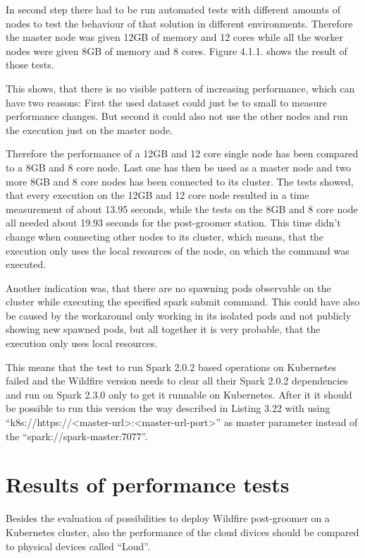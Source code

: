 In second step there had to be run automated tests with different amounts of nodes to test the behaviour of that solution in different environments. Therefore the master node was given 12GB of memory and 12 cores while all the worker nodes were given 8GB of memory and 8 cores. Figure 4.1.1. shows the result of those tests.

This shows, that there is no visible pattern of increasing performance, which can have two reasons: First the used dataset could just be to small to measure performance changes. But second it could also not use the other nodes and run the execution just on the master node.

Therefore the performance of a 12GB and 12 core single node has been compared to a 8GB and 8 core node. Last one has then be used as a master node and two more 8GB and 8 core nodes has been connected to its cluster. The tests showed, that every execution on the 12GB and 12 core node resulted in a time measurement of about 13.95 seconds, while the tests on the 8GB and 8 core node all needed about 19.93 seconds for the post-groomer station. This time didn't change when connecting other nodes to its cluster, which means, that the execution only uses the local resources of the node, on which the command was executed.

Another indication was, that there are no spawning pods observable on the cluster while executing the specified spark submit command. This could have also be caused by the workaround only working in its isolated pods and not publicly showing new spawned pods, but all together it is very probable, that the execution only uses local resources.

This means that the test to run Spark 2.0.2 based operations on Kubernetes failed and the Wildfire version needs to clear all their Spark 2.0.2 dependencies and run on Spark 2.3.0 only to get it runnable on Kubernetes. After it it should be possible to run this version the way described in Listing 3.22 with using ``k8s://https://<master-url>:<master-url-port>'' as master parameter instead of the ``spark://spark-master:7077''.

\section{Results of performance tests}

Besides the evaluation of possibilities to deploy Wildfire post-groomer on a Kubernetes cluster, also the performance of the cloud divices should be compared to physical devices called ``Loud''.


